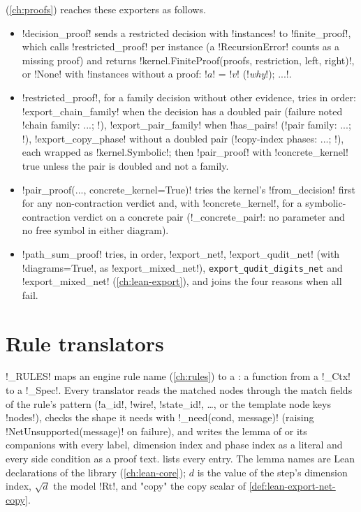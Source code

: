{ (\cref{ch:proofs}) reaches these exporters as
follows.
\begin{itemize}
\item \py!decision_proof! sends a restricted decision with \py!instances! to
  \py!finite_proof!, which calls \py!restricted_proof! per instance (a \py!RecursionError!
  counts as a missing proof) and returns \py!kernel.FiniteProof(proofs, restriction, left, right)!,
  or \py!None! with \code!instances without a proof: !$a$\code! = !$v$\code! (!\textit{why}\code!); ...!.
\item \py!restricted_proof!, for a family decision without other evidence, tries in order:
  \py!export_chain_family! when the decision has a doubled pair (failure noted
  \code!chain family: ...; !), \py!export_pair_family! when \py!has_pairs! (\code!pair family: ...; !),
  \py!export_copy_phase! without a doubled pair (\code!copy-index phases: ...; !), each wrapped as
  \py!kernel.Symbolic!; then \py!pair_proof! with \py!concrete_kernel! true unless the pair is
  doubled and not a family.
\item \py!pair_proof(..., concrete_kernel=True)! tries the kernel's \py!from_decision! first for
  any non-contraction verdict and, with \py!concrete_kernel!, for a symbolic-contraction verdict on
  a concrete pair (\py!_concrete_pair!: no parameter and no free symbol in either diagram).
\item \py!path_sum_proof! tries, in order, \py!export_net!, \py!export_qudit_net! (with \py!diagrams=True!, as \py!export_mixed_net!),
  \texttt{export\_\allowbreak{}qudit\_\allowbreak{}digits\_\allowbreak{}net} and \py!export_mixed_net! (\cref{ch:lean-export}), and joins the four
  reasons when all fail.
\end{itemize}

\section{Rule translators}\label{sec:lean-export-net-rules}

\py!_RULES! maps an engine rule name (\cref{ch:rules}) to a : a function from a
\py!_Ctx! to a \py!_Spec!. Every translator reads the matched nodes through the match fields of
the rule's pattern (\code!a_id!, \code!wire!, \code!state_id!, …, or the template node keys
\code!nodes!), checks the shape it needs with \py!_need(cond, message)! (raising
\py!NetUnsupported(message)! on failure), and writes the lemma of  or
its companions with every label, dimension index and phase index as a literal and every side
condition as a proof text.  lists every entry. The lemma names are
Lean declarations of the library (\cref{ch:lean-core}); $d$ is the value of the step's dimension
index, $\sqrt d$ the model \py!Rt!, and "copy" the copy scalar of \cref{def:lean-export-net-copy}.

}
